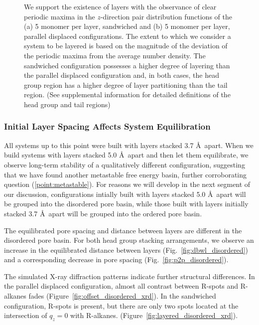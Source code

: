 \documentclass[journal=jpcbfk,manusciprt=article]{achemso}
\begin{document}
\begin{figure}
\begin{subfigure}{0.45\textwidth}
                \caption{}\label{fig:zdf_offset}
        \end{subfigure}
	\caption{We support the existence of layers with the observance of
		clear periodic maxima in the $z$-direction pair distribution functions of the
		(a) 5 monomer per layer, sandwiched and (b) 5 monomer per layer, parallel
		displaced configurations. The extent to which we consider a system to be
		layered is based on the magnitude of the deviation of the periodic maxima from
		the average number density. The sandwiched configuration possesses a higher
		degree of layering than the parallel displaced configuration and, in both
		cases, the head group region has a higher degree of layer partitioning than the
		tail region. (See supplemental information for detailed definitions of the head
		group and tail regions)}\label{fig:zdf}
  \end{figure}

  \subsubsection{Initial Layer Spacing Affects System Equilibration}

  All systems up to this point were built with layers stacked 3.7 \AA~apart.
  When we build systems with layers stacked 5.0 \AA~apart and then let them
  equilibrate, we observe long-term stability of a qualitatively different
  configuration, suggesting that we have found another metastable free energy
  basin, further corroborating question (\ref{point:metastable}). 
  For reasons we will develop in the next segment of our
  discussion, configurations intially built with layers stacked 5.0 \AA~apart 
  will be grouped into the disordered pore basin, while those built with layers
  initially stacked 3.7 \AA~apart will be grouped into the ordered pore basin.

  The equilibrated pore spacing and distance between layers are different in
  the disordered pore basin. For both head group stacking arrangements, we
  observe an increase in the equilibrated distance between layers
  (Fig.~\ref{fig:dbwl_disordered}) and a corresponding decrease in pore spacing
  (Fig.~\ref{fig:p2p_disordered}).

  The simulated X-ray diffraction patterns indicate further structural
  differences. In the parallel displaced configuration, almost all contrast
  between R-spots and R-alkanes fades (Figure~\ref{fig:offset_disordered_xrd}).
  In the sandwiched configuration, R-spots is present, but there are only two
  spots located at the intersection of $q_z=0$ with R-alkanes.
  (Figure~\ref{fig:layered_disordered_xrd}). 
\end{document}
